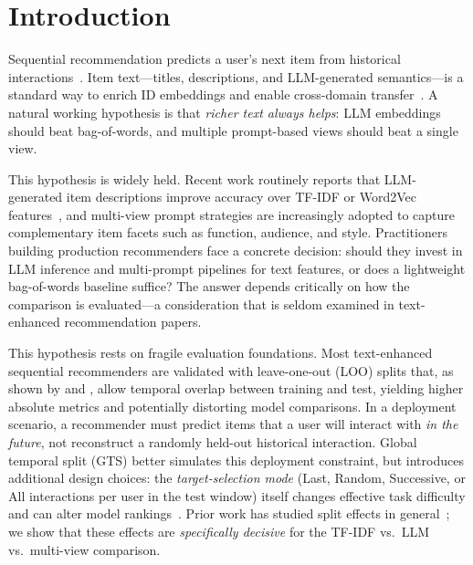 \documentclass[sigconf,natbib=true,anonymous]{acmart}
\newcommand{\tfidf}{\textsc{TF-IDF}\xspace}
\newcommand{\llm}{\textsc{LLM}\xspace}
\begin{document}

\maketitle

\section{Introduction}
\label{sec:intro}

Sequential recommendation predicts a user's next item from historical interactions~\cite{kang2018sasrec,sun2019bert4rec,hidasi2016gru4rec}.
Item text---titles, descriptions, and LLM-generated semantics---is a standard way to enrich ID embeddings and enable cross-domain transfer~\cite{hou2022unisrec,bao2023tallrec}.
A natural working hypothesis is that \emph{richer text always helps}: LLM embeddings should beat bag-of-words, and multiple prompt-based views should beat a single view.

This hypothesis is widely held.
Recent work routinely reports that LLM-generated item descriptions improve accuracy over TF-IDF or Word2Vec features~\cite{hou2022unisrec,bao2023tallrec}, and multi-view prompt strategies are increasingly adopted to capture complementary item facets such as function, audience, and style.
Practitioners building production recommenders face a concrete decision: should they invest in LLM inference and multi-prompt pipelines for text features, or does a lightweight bag-of-words baseline suffice?
The answer depends critically on how the comparison is evaluated---a consideration that is seldom examined in text-enhanced recommendation papers.

This hypothesis rests on fragile evaluation foundations.
Most text-enhanced sequential recommenders are validated with leave-one-out (LOO) splits that, as shown by \citet{ji2023evaluation} and \citet{sun2023reevaluation}, allow temporal overlap between training and test, yielding higher absolute metrics and potentially distorting model comparisons.
In a deployment scenario, a recommender must predict items that a user will interact with \emph{in the future}, not reconstruct a randomly held-out historical interaction.
Global temporal split (GTS) better simulates this deployment constraint, but introduces additional design choices: the \emph{target-selection mode} (Last, Random, Successive, or All interactions per user in the test window) itself changes effective task difficulty and can alter model rankings~\cite{gusak2025time}.
Prior work has studied split effects in general~\cite{meng2020temporal,ji2023evaluation}; we show that these effects are \emph{specifically decisive} for the \tfidf vs.\ \llm vs.\ multi-view comparison.
\end{document}
